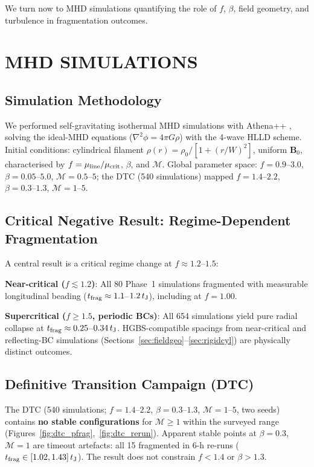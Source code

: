 \documentclass[twoside,twocolumn]{mnras}
\begin{document}
We turn now to MHD simulations quantifying the role of $f$, $\beta$, field geometry,
and turbulence in fragmentation outcomes.

\section{MHD SIMULATIONS}

\subsection{Simulation Methodology}

We performed self-gravitating isothermal MHD simulations with Athena++ \citep{Stone2020},
solving the ideal-MHD equations ($\nabla^2\phi = 4\pi G\rho$) with the 4-wave HLLD
scheme. Initial conditions: cylindrical filament $\rho(r) = \rho_0/[1+(r/W)^2]$,
uniform $\mathbf{B}_0$, characterised by $f = \mu_{\rm line}/\mu_{\rm crit}$, $\beta$,
and $\mathcal{M}$. Global parameter space: $f=0.9$--$3.0$, $\beta=0.05$--$5.0$,
$\mathcal{M}=0.5$--$5$; the DTC (540 simulations) mapped $f=1.4$--$2.2$,
$\beta=0.3$--$1.3$, $\mathcal{M}=1$--$5$.

\subsection{Critical Negative Result: Regime-Dependent Fragmentation}
\label{sec:critnat}

A central result is a critical regime change at $f \approx 1.2$--$1.5$:

\textbf{Near-critical ($f \lesssim 1.2$)}: All 80 Phase~1 simulations fragmented with measurable longitudinal beading ($t_{\rm frag} \approx 1.1$--$1.2\,t_{\rm J}$), including at $f = 1.00$.

\textbf{Supercritical ($f \geq 1.5$, periodic BCs)}: All 654 simulations yield pure radial collapse at $t_{\rm frag} \approx 0.25$--$0.34\,t_{\rm J}$. HGBS-compatible spacings from near-critical and reflecting-BC simulations (Sections~\ref{sec:fieldgeo}--\ref{sec:rigidcyl}) are physically distinct outcomes.

\subsection{Definitive Transition Campaign (DTC)}
\label{sec:dtc}

The DTC (540 simulations; $f=1.4$--$2.2$, $\beta=0.3$--$1.3$, $\mathcal{M}=1$--$5$,
two seeds) contains \textbf{no stable configurations} for $\mathcal{M} \geq 1$
within the surveyed range (Figures~\ref{fig:dtc_pfrag},~\ref{fig:dtc_rerun}).
Apparent stable points at $\beta=0.3$, $\mathcal{M}=1$ are timeout artefacts:
all 15 fragmented in 6-h re-runs ($t_{\rm frag} \in [1.02, 1.43]\,t_{\rm J}$).
The result does not constrain $f < 1.4$ or $\beta > 1.3$.
\end{document}
